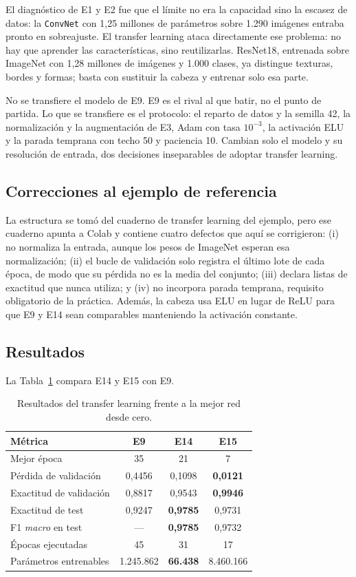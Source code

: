 \documentclass[11pt,a4paper]{article}
\begin{document}
El diagnóstico de E1 y E2 fue que el límite no era la capacidad sino la escasez de datos: la \texttt{ConvNet} con 1,25 millones de parámetros sobre 1.290 imágenes entraba pronto en sobreajuste. El transfer learning ataca directamente ese problema: no hay que aprender las características, sino reutilizarlas. ResNet18, entrenada sobre ImageNet con 1,28 millones de imágenes y 1.000 clases, ya distingue texturas, bordes y formas; basta con sustituir la cabeza y entrenar solo esa parte.

No se transfiere el modelo de E9. E9 es el rival al que batir, no el punto de partida. Lo que se transfiere es el protocolo: el reparto de datos y la semilla 42, la normalización y la augmentación de E3, Adam con tasa $10^{-3}$, la activación ELU y la parada temprana con techo 50 y paciencia 10. Cambian solo el modelo y su resolución de entrada, dos decisiones inseparables de adoptar transfer learning.

\subsection{Correcciones al ejemplo de referencia}

La estructura se tomó del cuaderno de transfer learning del ejemplo, pero ese cuaderno apunta a Colab y contiene cuatro defectos que aquí se corrigieron: (i) no normaliza la entrada, aunque los pesos de ImageNet esperan esa normalización; (ii) el bucle de validación solo registra el último lote de cada época, de modo que su pérdida no es la media del conjunto; (iii) declara listas de exactitud que nunca utiliza; y (iv) no incorpora parada temprana, requisito obligatorio de la práctica. Además, la cabeza usa ELU en lugar de ReLU para que E9 y E14 sean comparables manteniendo la activación constante.

\subsection{Resultados}

La Tabla~\ref{tab:tl} compara E14 y E15 con E9.

\begin{table}[htbp]
\centering
\small
\caption{Resultados del transfer learning frente a la mejor red desde cero.}
\label{tab:tl}
\begin{tabular}{lccc}
\toprule
Métrica & E9 & \textbf{E14} & E15 \\
\midrule
Mejor época & 35 & 21 & 7 \\
Pérdida de validación & 0,4456 & 0,1098 & \textbf{0,0121} \\
Exactitud de validación & 0,8817 & 0,9543 & \textbf{0,9946} \\
Exactitud de test & 0,9247 & \textbf{0,9785} & 0,9731 \\
F1 \emph{macro} en test & --- & \textbf{0,9785} & 0,9732 \\
Épocas ejecutadas & 45 & 31 & 17 \\
Parámetros entrenables & 1.245.862 & \textbf{66.438} & 8.460.166 \\
\bottomrule
\end{tabular}
\end{table}
\end{document}
